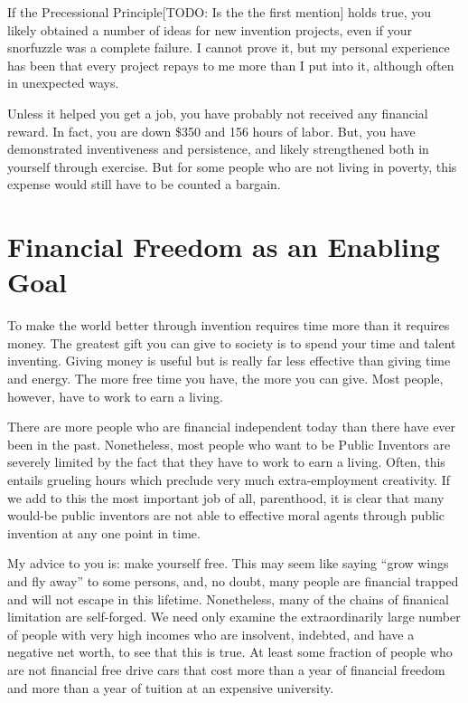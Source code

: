 \documentclass[
	fontsize=10pt, %
	twoside=false, %
	secnumdepth=1, %
]{kaobook}
\begin{document}
If the Precessional Principle[TODO: Is the the first mention] holds true, you likely obtained a
number of ideas for new invention projects, even if your snorfuzzle
was a complete failure. I cannot prove it, but my personal experience
has been that every project repays to me more than I put into it,
although often in unexpected ways.

Unless it helped you get a job, you have probably not received any
financial reward. In fact, you are down \$350 and 156 hours of labor.
But, you have demonstrated inventiveness and persistence, and likely
strengthened both in yourself through exercise.
But for some people who are not living in poverty, this expense would still have to be counted a bargain.

\chapter{Financial Freedom as an Enabling Goal}

To make the world better through invention requires time more
than it requires money.
The greatest gift you can give to society
is to spend your time and talent inventing.
Giving money is useful but
is really far less effective than giving time and energy.
The more free time you have, the more you can give.
Most people, however,
have to work to earn a living.

There are more people who are financial independent today than there
have ever been in the past. Nonetheless, most people who want to be
Public Inventors are severely limited by the fact that they have to
work to earn a living.
Often, this entails grueling hours which preclude
very much extra-employment creativity. If we add to this the most
important job of all, parenthood, it is clear that many would-be
public inventors are not able to effective moral agents through public
invention at any one point in time.

My advice to you is: make yourself free. This may seem like
saying ``grow wings and fly away'' to some persons, and,
no doubt, many people are financial trapped and will not
escape in this lifetime.
Nonetheless, many of the chains of finanical limitation are
self-forged. We need only examine the extraordinarily large
number of people with very high incomes who are insolvent,
indebted, and have a negative net worth, to see that this is true.
At least some fraction of people who are not financial free
drive cars that cost more than a year of financial freedom and more
than a year of tuition at an expensive university.
\end{document}

